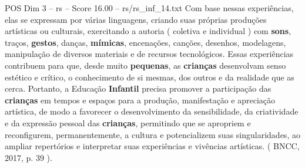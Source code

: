 \begin{textsample}{POS Dim 3 – rs – Score 16.00 – rs/rs\_inf\_14.txt}
Com base nessas experiências, elas se expressam por várias linguagens, criando suas próprias produções artísticas ou culturais, exercitando a autoria ( coletiva e individual ) com \textbf{sons}, traços, \textbf{gestos}, danças, \textbf{mímicas}, encenações, canções, desenhos, modelagens, manipulação de diversos materiais e de recursos tecnológicos.
Essas experiências contribuem para que, desde muito \textbf{pequenas}, as \textbf{crianças} desenvolvam senso estético e crítico, o conhecimento de si mesmas, dos outros e da realidade que as cerca.
Portanto, a Educação \textbf{Infantil} precisa promover a participação das \textbf{crianças} em tempos e espaços para a produção, manifestação e apreciação artística, de modo a favorecer o desenvolvimento da sensibilidade, da criatividade e da expressão pessoal das \textbf{crianças}, permitindo que se apropriem e reconfigurem, permanentemente, a cultura e potencializem suas singularidades, ao ampliar repertórios e interpretar suas experiências e vivências artísticas. ( BNCC, 2017, p. 39 ).

\end{textsample}
